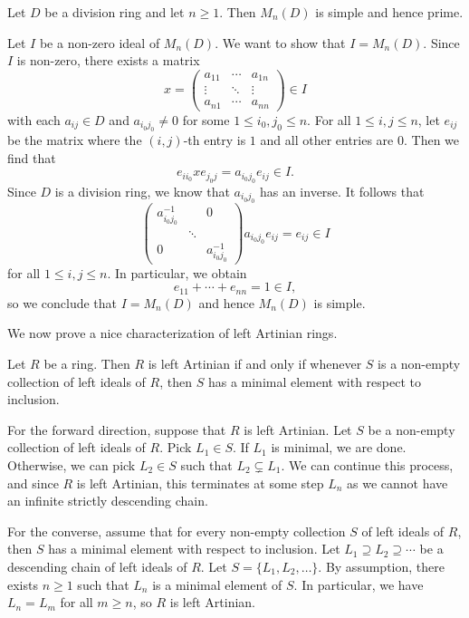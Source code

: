 \begin{prop}
Let $D$ be a division ring and let $n \geq 1$. Then $M_n(D)$ is simple and hence prime. 
\end{prop}
\begin{pf}
Let $I$ be a non-zero ideal of $M_n(D)$. We want to show that $I = M_n(D)$. Since $I$ is 
non-zero, there exists a matrix 
\[ x = \begin{pmatrix} a_{11} & \cdots & a_{1n} \\ \vdots & \ddots & \vdots \\ a_{n1} & \cdots & a_{nn} \end{pmatrix} \in I \]
with each $a_{ij} \in D$ and $a_{i_0j_0} \neq 0$ for some $1 \leq i_0, j_0 \leq n$. For all 
$1 \leq i, j \leq n$, let $e_{ij}$ be the matrix where the $(i,j)$-th entry is $1$ and all other entries
are $0$. Then we find that 
\[ e_{ii_0}xe_{j_0j} = a_{i_0j_0}e_{ij} \in I. \]
Since $D$ is a division ring, we know that $a_{i_0j_0}$ has an inverse. It follows that 
\[ \begin{pmatrix} a_{i_0j_0}^{-1} & & 0 \\ & \ddots \\ 0 & & a_{i_0j_0}^{-1} \end{pmatrix} a_{i_0j_0} e_{ij} = e_{ij} \in I \]
for all $1 \leq i, j \leq n$. In particular, we obtain 
\[ e_{11} + \cdots + e_{nn} = 1 \in I, \]
so we conclude that $I = M_n(D)$ and hence $M_n(D)$ is simple. 
\end{pf}

We now prove a nice characterization of left Artinian rings. 

\begin{prop}
Let $R$ be a ring. Then $R$ is left Artinian if and only if whenever $S$ is a non-empty collection 
of left ideals of $R$, then $S$ has a minimal element with respect to inclusion. 
\end{prop}
\begin{pf}
For the forward direction, suppose that $R$ is left Artinian. Let $S$ be a non-empty collection of 
left ideals of $R$. Pick $L_1 \in S$. If $L_1$ is minimal, we are done. Otherwise, we can pick $L_2 
\in S$ such that $L_2 \subsetneq L_1$. We can continue this process, and since $R$ is left 
Artinian, this terminates at some step $L_n$ as we cannot have an infinite strictly descending chain.

For the converse, assume that for every non-empty collection $S$ of left ideals of $R$, then 
$S$ has a minimal element with respect to inclusion. Let $L_1 \supseteq L_2 \supseteq \cdots$ 
be a descending chain of left ideals of $R$. Let $S = \{L_1, L_2, \dots\}$. By assumption, there 
exists $n \geq 1$ such that $L_n$ is a minimal element of $S$. In particular, we have 
$L_n = L_m$ for all $m \geq n$, so $R$ is left Artinian.
\end{pf}

